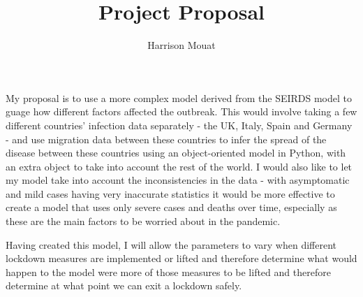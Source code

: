 \documentclass{article}
\author{Harrison Mouat}
\title{Project Proposal}
\begin{document}
\maketitle
My proposal is to use a more complex model derived from the SEIRDS model to guage how different factors affected the outbreak. This would involve taking a few different countries' infection data separately - the UK, Italy, Spain and Germany - and use migration data between these countries to infer the spread of the disease between these countries using an object-oriented model in Python, with an extra object to take into account the rest of the world. I would also like to let my model take into account the inconsistencies in the data - with asymptomatic and mild cases having very inaccurate statistics it would be more effective to create a model that uses only severe cases and deaths over time, especially as these are the main factors to be worried about in the pandemic.

Having created this model, I will allow the parameters to vary when different lockdown measures are implemented or lifted and therefore determine what would happen to the model were more of those measures to be lifted and therefore determine at what point we can exit a lockdown safely.
\end{document}
